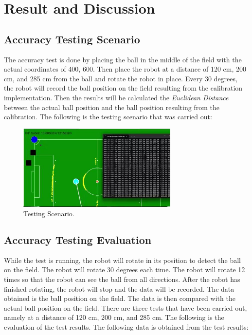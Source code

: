 \section{Result and Discussion}
\label{sec:resultdiscussion}

\subsection{Accuracy Testing Scenario}
\label{sec:skenariopengujian}

The accuracy test is done by placing the ball in the middle of the field with the actual coordinates of {400, 600}. Then place the robot at a distance of 120 cm, 200 cm, and 285 cm from the ball and rotate the robot in place. Every 30 degrees, the robot will record the ball position on the field resulting from the calibration implementation. Then the results will be calculated the \emph{Euclidean Distance} between the actual ball position and the ball position resulting from the calibration. The following is the testing scenario that was carried out:

\begin{figure}[H]
  \centering
  \includegraphics[width=8cm]{gambar/saat_putar_bola_2.jpeg}
  \caption{Testing Scenario.}
  \label{fig:skenariopengujian}
\end{figure}

\subsection{Accuracy Testing Evaluation}
\label{sec:analisispengujian3}

While the test is running, the robot will rotate in its position to detect the ball on the field. The robot will rotate 30 degrees each time. The robot will rotate 12 times so that the robot can see the ball from all directions. After the robot has finished rotating, the robot will stop and the data will be recorded. The data obtained is the ball position on the field. The data is then compared with the actual ball position on the field. There are three tests that have been carried out, namely at a distance of 120 cm, 200 cm, and 285 cm. The following is the evaluation of the test results. The following data is obtained from the test results:

